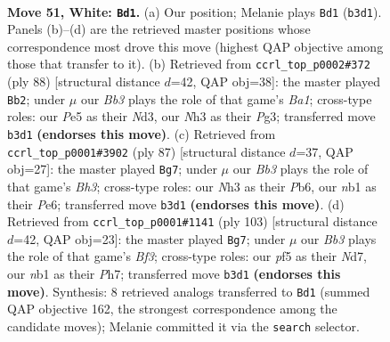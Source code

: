 \documentclass[11pt]{article}
\begin{document}
\clearpage

\begin{figure}[p]\centering
\begin{subfigure}{0.46\textwidth}\centering
\resizebox{\linewidth}{!}{%
\newchessgame
\chessboard[
  setfen={6k1/2r2p1p/b5p1/4Pp2/5P2/1B5N/P4KPP/1n6 w - - 10 51},
  showmover=false,
  pgfstyle=straightmove, color=movearrow, markmove={b3-d1}
]}
\caption{}
\end{subfigure}\hfill
\begin{subfigure}{0.46\textwidth}\centering
\resizebox{\linewidth}{!}{%
\newchessgame
\chessboard[
  setfen={8/2r2pk1/5pp1/b2B4/8/3N2Pp/5P1P/B4K2 w - - 5 45},
  showmover=false,
  pgfstyle=straightmove, color=movearrow, markmove={a1-b2}
]}
\caption{}
\end{subfigure}
\\[4pt]
\begin{subfigure}{0.46\textwidth}\centering
\resizebox{\linewidth}{!}{%
\newchessgame
\chessboard[
  setfen={8/5p2/1p2pn1b/p1k5/6p1/PK2P1P1/1P1NBP2/8 b - - 6 44},
  showmover=false,
  pgfstyle=straightmove, color=movearrow, markmove={h6-g7}
]}
\caption{}
\end{subfigure}\hfill
\begin{subfigure}{0.46\textwidth}\centering
\resizebox{\linewidth}{!}{%
\newchessgame
\chessboard[
  setfen={3k4/3n3p/B3nbp1/2p2p2/2N5/5P1P/1P4PB/5K2 b - - 4 52},
  showmover=false,
  pgfstyle=straightmove, color=movearrow, markmove={f6-g7}
]}
\caption{}
\end{subfigure}
\caption{\textbf{Move 51, White: \texttt{Bd1}.} (a) Our position; Melanie plays \texttt{Bd1} (\texttt{b3d1}). Panels (b)--(d) are the retrieved master positions whose correspondence most drove this move (highest QAP objective among those that transfer to it). (b) Retrieved from \texttt{ccrl\_top\_p0002\#372} (ply 88) [structural distance $d$=42, QAP obj=38]: the master played \texttt{Bb2}; under $\mu$ our \emph{Bb3} plays the role of that game's \emph{Ba1}; cross-type roles: our \emph{P}e5 as their \emph{N}d3, our \emph{N}h3 as their \emph{P}g3; transferred move \texttt{b3d1} \textbf{(endorses this move)}. (c) Retrieved from \texttt{ccrl\_top\_p0001\#3902} (ply 87) [structural distance $d$=37, QAP obj=27]: the master played \texttt{Bg7}; under $\mu$ our \emph{Bb3} plays the role of that game's \emph{Bh3}; cross-type roles: our \emph{N}h3 as their \emph{P}b6, our \emph{n}b1 as their \emph{P}e6; transferred move \texttt{b3d1} \textbf{(endorses this move)}. (d) Retrieved from \texttt{ccrl\_top\_p0001\#1141} (ply 103) [structural distance $d$=42, QAP obj=23]: the master played \texttt{Bg7}; under $\mu$ our \emph{Bb3} plays the role of that game's \emph{Bf3}; cross-type roles: our \emph{p}f5 as their \emph{N}d7, our \emph{n}b1 as their \emph{P}h7; transferred move \texttt{b3d1} \textbf{(endorses this move)}. Synthesis: 8 retrieved analogs transferred to \texttt{Bd1} (summed QAP objective 162, the strongest correspondence among the candidate moves); Melanie committed it via the \texttt{search} selector.}
\label{fig:thought-m100}
\end{figure}
\end{document}

